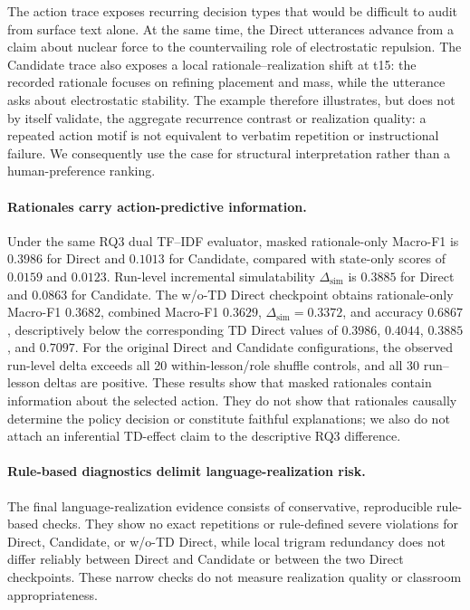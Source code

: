 \documentclass[manuscript,review,anonymous]{acmart}
\begin{document}
The action trace exposes recurring decision types that would be difficult to
audit from surface text alone. At the same time, the Direct utterances advance
from a claim about nuclear force to the countervailing role of electrostatic
repulsion. The Candidate trace also exposes a local rationale--realization shift
at t15: the recorded rationale focuses on refining placement and mass, while
the utterance asks about electrostatic stability. The example therefore
illustrates, but does not by itself validate, the aggregate recurrence contrast
or realization quality: a repeated action motif is not equivalent to verbatim
repetition or instructional failure. We consequently use the case for
structural interpretation rather than a human-preference ranking.

 
\paragraph{Rationales carry action-predictive information.}
Under the same RQ3 dual TF--IDF evaluator, masked rationale-only Macro-F1 is
$0.3986$ for Direct and $0.1013$ for Candidate, compared with state-only
scores of $0.0159$ and $0.0123$. Run-level incremental simulatability
$\Delta_{\mathrm{sim}}$ is $0.3885$ for Direct and $0.0863$ for Candidate.
The w/o-TD Direct checkpoint obtains rationale-only Macro-F1 $0.3682$,
combined Macro-F1 $0.3629$, $\Delta_{\mathrm{sim}}=0.3372$, and accuracy
$0.6867$, descriptively below the corresponding TD Direct values of $0.3986$,
$0.4044$, $0.3885$, and $0.7097$.
For the original Direct and Candidate configurations, the observed run-level
delta exceeds all 20 within-lesson/role shuffle controls, and all 30
run--lesson deltas are
positive. These results show that masked rationales contain information about
the selected action. They do not show that rationales causally determine the
policy decision or constitute faithful explanations; we also do not attach an
inferential TD-effect claim to the descriptive RQ3 difference.

\paragraph{Rule-based diagnostics delimit language-realization risk.}
The final language-realization evidence consists of conservative, reproducible
rule-based checks. They show no exact repetitions or rule-defined severe violations
for Direct, Candidate, or w/o-TD Direct, while local trigram redundancy does
not differ reliably between Direct and Candidate or between the two Direct
checkpoints. These narrow checks do not measure realization quality or
classroom appropriateness.
\end{document}
